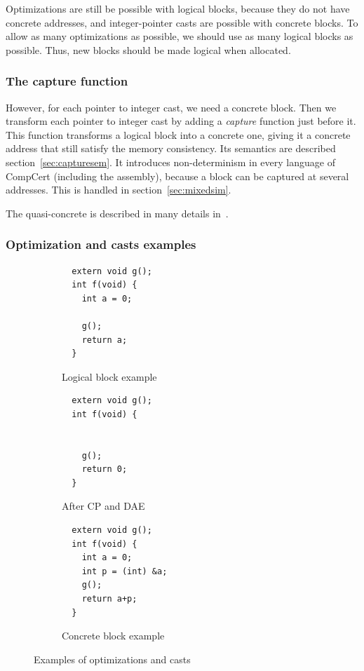 Optimizations are still be possible with logical blocks, because they do not have concrete addresses, and integer-pointer casts are possible with concrete blocks.
To allow as many optimizations as possible, we should use as many logical blocks as possible. Thus, new blocks should be made logical when allocated.

\subsubsection{The capture function}
However, for each pointer to integer cast, we need a concrete block. Then we transform each pointer to integer cast by adding a \textit{capture} function just before it. This function transforms a logical block into a concrete one, giving it a concrete address that still satisfy the memory consistency. Its semantics are described section~\ref{sec:capturesem}.
It introduces non-determinism in every language of CompCert (including the assembly), because a block can be captured at several addresses. This is handled in section~\ref{sec:mixedsim}.

The quasi-concrete is described in many details in~\cite{DBLP:conf/pldi/KangHMGZV15}.
\subsubsection{Optimization and casts examples}

\lstset{}
\begin{figure}
\begin{subfigure}{.33\textwidth}
  \begin{lstlisting}
  extern void g();
  int f(void) {
    int a = 0;
    
    g();
    return a;
  }
  \end{lstlisting}
  \caption{Logical block example}
  \label{fig:logical}
\end{subfigure}%
\begin{subfigure}{.33\textwidth}
  \begin{lstlisting}
  extern void g();
  int f(void) {

    
    g();
    return 0;
  }
  \end{lstlisting}
  \caption{After CP and DAE}
  \label{fig:cpdae}
\end{subfigure}
\begin{subfigure}{.33\textwidth}
  \begin{lstlisting}
  extern void g();
  int f(void) {
    int a = 0;
    int p = (int) &a;
    g();
    return a+p;
  }
  \end{lstlisting}
  \caption{Concrete block example}
  \label{fig:concrete}
\end{subfigure}
\caption{Examples of optimizations and casts}
\label{fig:examples}
\end{figure}

